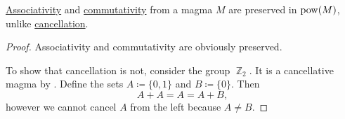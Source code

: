 \begin{proposition}\label{thm:power_set_magma_preservation}
  \hyperref[def:magma/associative]{Associativity} and \hyperref[def:magma/commutative]{commutativity} from a magma \( M \) are preserved in \( \operatorname{pow}(M) \), unlike \hyperref[def:magma/cancellative]{cancellation}.
\end{proposition}
\begin{proof}
  Associativity and commutativity are obviously preserved.

  To show that cancellation is not, consider the group \hyperref[def:group_of_integers_modulo]{\( \BbbZ_2 \)}. It is a cancellative magma by . Define the sets \( A \coloneqq \{ 0, 1 \} \) and \( B \coloneqq \{ 0 \} \). Then
  \begin{equation*}
    A + A = A = A + B,
  \end{equation*}
  however we cannot cancel \( A \) from the left because \( A \neq B \).
\end{proof}

